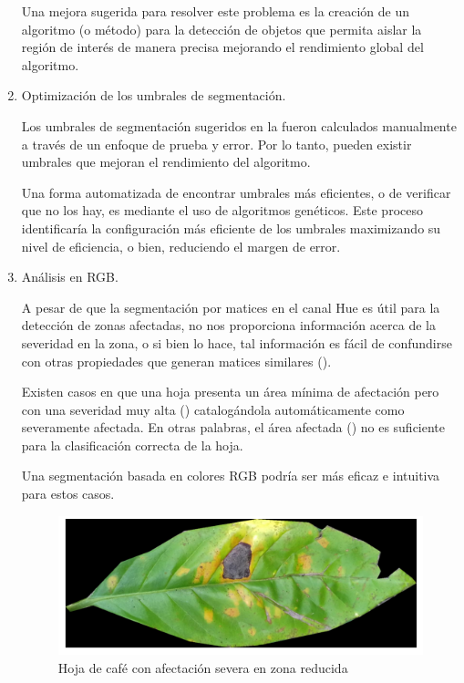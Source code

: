 \begin{enumerate}
Una mejora sugerida para resolver este problema es la creación de un algoritmo (o método) para la detección de objetos que permita aislar la región de interés de manera precisa mejorando el rendimiento global del algoritmo.

\item Optimización de los umbrales de segmentación.

Los umbrales de segmentación sugeridos en la  fueron calculados manualmente a través de un enfoque de prueba y error. Por lo tanto, pueden existir umbrales que mejoran el rendimiento del algoritmo.

Una forma automatizada de encontrar umbrales más eficientes, o de verificar que no los hay, es mediante el uso de algoritmos genéticos. Este proceso identificaría la configuración más eficiente de los umbrales maximizando su nivel de eficiencia, o bien, reduciendo el margen de error.

\item Análisis en \textsf{RGB}.

A pesar de que la segmentación por matices en el canal Hue es útil para la detección de zonas afectadas, no nos proporciona información acerca de la severidad en la zona, o si bien lo hace, tal información es fácil de confundirse con otras propiedades que generan matices similares ().

Existen casos en que una hoja presenta un área mínima de afectación pero con una severidad muy alta () catalogándola automáticamente como severamente afectada. En otras palabras, el área afectada () no es suficiente para la clasificación correcta de la hoja.

Una segmentación basada en colores \textsf{RGB} podría ser más eficaz e intuitiva para estos casos.

\begin{figure}[H]
\centering
\includegraphics[scale=1]{images/consideration_severity_rgb.png}
\caption{Hoja de café con afectación severa en zona reducida}
\label{img:issue_severity_rgb}
\end{figure}


\end{enumerate}
